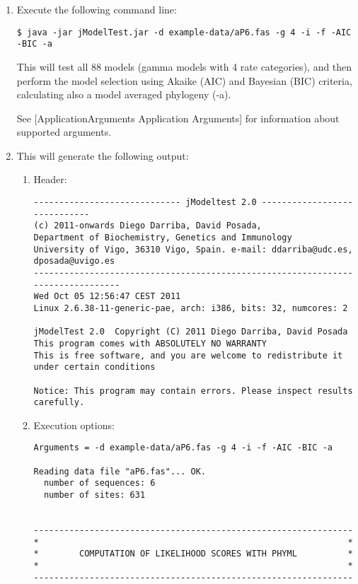\documentclass[11pt,twoside,a4paper]{article}
\begin{document}
\begin{enumerate}
\item Execute the following command line:
\begin{lstlisting}
$ java -jar jModelTest.jar -d example-data/aP6.fas -g 4 -i -f -AIC -BIC -a
\end{lstlisting}

This will test all 88 models (gamma models with 4 rate categories), and then perform the model selection using Akaike (AIC) and Bayesian (BIC) criteria, calculating also a model averaged phylogeny (-a).

See [ApplicationArguments Application Arguments] for information about supported arguments.

\item This will generate the following output:

\begin{enumerate}

\item Header:

\begin{lstlisting}
----------------------------- jModeltest 2.0 -----------------------------
(c) 2011-onwards Diego Darriba, David Posada,
Department of Biochemistry, Genetics and Immunology
University of Vigo, 36310 Vigo, Spain. e-mail: ddarriba@udc.es, dposada@uvigo.es
--------------------------------------------------------------------------------
Wed Oct 05 12:56:47 CEST 2011
Linux 2.6.38-11-generic-pae, arch: i386, bits: 32, numcores: 2

jModelTest 2.0  Copyright (C) 2011 Diego Darriba, David Posada
This program comes with ABSOLUTELY NO WARRANTY
This is free software, and you are welcome to redistribute it
under certain conditions
 
Notice: This program may contain errors. Please inspect results carefully.
\end{lstlisting}

\item Execution options:

\begin{lstlisting} 
Arguments = -d example-data/aP6.fas -g 4 -i -f -AIC -BIC -a

Reading data file "aP6.fas"... OK.
  number of sequences: 6
  number of sites: 631
 
 
---------------------------------------------------------------
*                                                             *
*        COMPUTATION OF LIKELIHOOD SCORES WITH PHYML          *
*                                                             *
---------------------------------------------------------------
 

\end{lstlisting}
\end{enumerate}
\end{enumerate}
\end{document}
